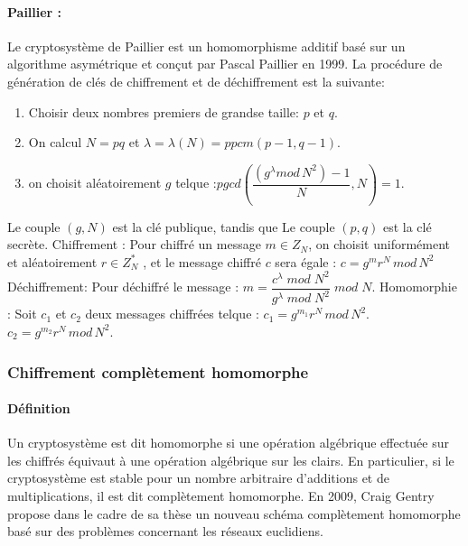 \documentclass[a4paper,12pt]{article}
\begin{document}
\paragraph{Paillier : }
Le cryptosystème de Paillier est un homomorphisme additif basé sur un algorithme asymétrique et conçut par Pascal Paillier en 1999.\newline
La procédure de génération de clés de chiffrement et de déchiffrement est la suivante:
\begin{enumerate}
\item Choisir deux nombres premiers de grandse taille: $p$   et $q$.
\item  On calcul $N=pq$ \newline et $\lambda =\lambda(N) = ppcm(p-1, q-1)$.
\item  on choisit aléatoirement $g$ telque :\newline $pgcd(\dfrac{(g^\lambda mod\, N^2)-1 }{N}, N) = 1$.\newline
\end{enumerate}
Le couple $(g, N)$ est la clé publique, tandis que Le couple $(p,q)$ est la clé secrète.\newline
Chiffrement :\newline
Pour chiffré un message $m \in Z_N$, on choisit uniformément et aléatoirement $r\in Z^{*}_N$ ,\newline
et le message chiffré $c$ sera égale : $c = g^mr^N\,mod\,N^2$\newline
Déchiffrement:\newline
Pour déchiffré le message : $m = \dfrac{c^\lambda\;mod\;N^2}{g^\lambda\;mod\;N^2}\;mod\;N.$\newline
Homomorphie :\newline
Soit $c_1$ et $c_2$ deux messages chiffrées telque :\newline
$c_1 = g^{m_1}r^N\,mod\,N^2.$\newline
$c_2 = g^{m_2}r^N\,mod\,N^2.$\newline
\subsubsection{Chiffrement complètement homomorphe}
          \paragraph{Définition }
Un cryptosystème est dit homomorphe si une opération algébrique effectuée sur les chiffrés équivaut à une opération algébrique sur les clairs. En particulier, si le cryptosystème est stable pour un nombre arbitraire d'additions et de multiplications, il est dit complètement homomorphe.\newline
En 2009, Craig Gentry propose dans le cadre de sa thèse un nouveau schéma complètement homomorphe basé sur des problèmes concernant les réseaux euclidiens.
\end{document}
